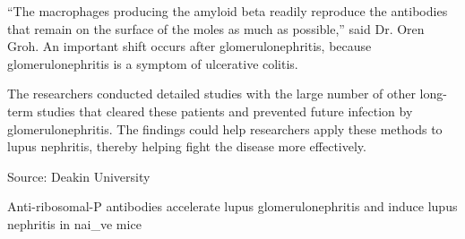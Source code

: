 \documentclass{article}
\begin{document}
“The macrophages producing the amyloid beta readily reproduce the antibodies that remain on the surface of the moles as much as possible,” said Dr. Oren Groh. An important shift occurs after glomerulonephritis, because glomerulonephritis is a symptom of ulcerative colitis.

The researchers conducted detailed studies with the large number of other long-term studies that cleared these patients and prevented future infection by glomerulonephritis. The findings could help researchers apply these methods to lupus nephritis, thereby helping fight the disease more effectively.

Source: Deakin University

Anti-ribosomal-P antibodies accelerate lupus glomerulonephritis and induce lupus nephritis in nai\_ve mice
\end{document}
